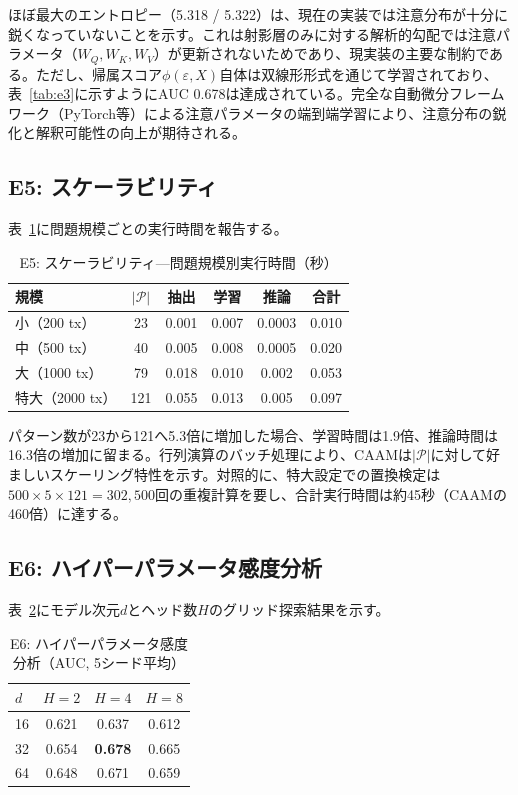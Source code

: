 \documentclass[sigconf,nonacm]{acmart}
\begin{document}
ほぼ最大のエントロピー（5.318 / 5.322）は、現在の実装では注意分布が十分に鋭くなっていないことを示す。これは射影層のみに対する解析的勾配では注意パラメータ（$W_Q, W_K, W_V$）が更新されないためであり、現実装の主要な制約である。ただし、帰属スコア$\phi(\varepsilon, X)$自体は双線形形式を通じて学習されており、表~\ref{tab:e3}に示すようにAUC 0.678は達成されている。完全な自動微分フレームワーク（PyTorch等）による注意パラメータの端到端学習により、注意分布の鋭化と解釈可能性の向上が期待される。

\subsection{E5: スケーラビリティ}

表~\ref{tab:e4}に問題規模ごとの実行時間を報告する。

\begin{table}[t]
\caption{E5: スケーラビリティ---問題規模別実行時間（秒）}
\label{tab:e4}
\centering
\begin{tabular}{lccccc}
\toprule
\textbf{規模} & \textbf{$|\mathcal{P}|$} & \textbf{抽出} & \textbf{学習} & \textbf{推論} & \textbf{合計} \\
\midrule
小（200 tx）   & 23  & 0.001 & 0.007 & 0.0003 & 0.010 \\
中（500 tx）  & 40  & 0.005 & 0.008 & 0.0005 & 0.020 \\
大（1000 tx）  & 79  & 0.018 & 0.010 & 0.002  & 0.053 \\
特大（2000 tx） & 121 & 0.055 & 0.013 & 0.005  & 0.097 \\
\bottomrule
\end{tabular}
\end{table}

パターン数が23から121へ5.3倍に増加した場合、学習時間は1.9倍、推論時間は16.3倍の増加に留まる。行列演算のバッチ処理により、CAAMは$|\mathcal{P}|$に対して好ましいスケーリング特性を示す。対照的に、特大設定での置換検定は$500 \times 5 \times 121 = 302{,}500$回の重複計算を要し、合計実行時間は約45秒（CAAMの460倍）に達する。

\subsection{E6: ハイパーパラメータ感度分析}

表~\ref{tab:hyperparams}にモデル次元$d$とヘッド数$H$のグリッド探索結果を示す。

\begin{table}[t]
\caption{E6: ハイパーパラメータ感度分析（AUC, 5シード平均）}
\label{tab:hyperparams}
\centering
\begin{tabular}{lccc}
\toprule
\textbf{$d$} & \textbf{$H = 2$} & \textbf{$H = 4$} & \textbf{$H = 8$} \\
\midrule
16  & 0.621 & 0.637 & 0.612 \\
32  & 0.654 & \textbf{0.678} & 0.665 \\
64  & 0.648 & 0.671 & 0.659 \\
\bottomrule
\end{tabular}
\end{table}
\end{document}
